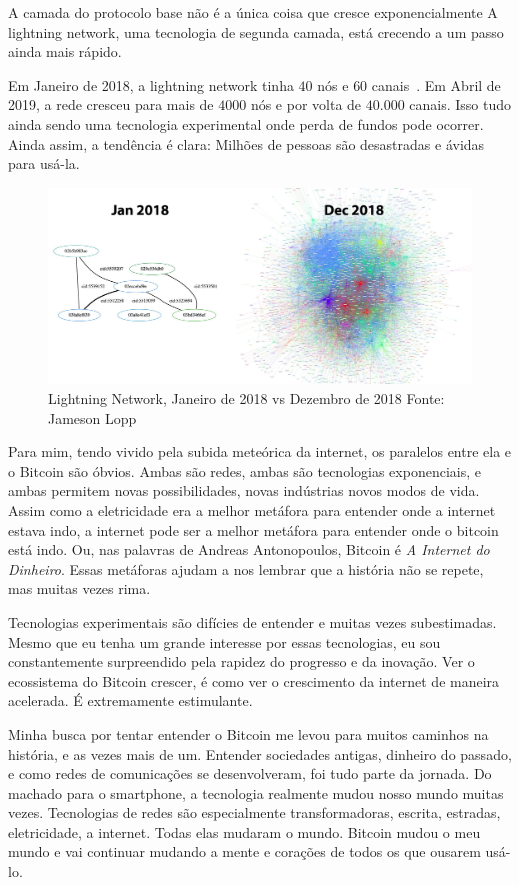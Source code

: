 A camada do protocolo base não é a única coisa que cresce exponencialmente
A lightning network, uma tecnologia de segunda camada, está crecendo a um passo ainda mais rápido.

Em Janeiro de 2018, a lightning network tinha $40$ nós e $60$ canais~\cite{web:lightning-nodes}.
Em Abril de 2019, a rede cresceu para mais de $4000$ nós e por volta de $40.000$ canais.
Isso tudo ainda sendo uma tecnologia experimental onde perda de fundos pode ocorrer. 
Ainda assim, a tendência é clara: Milhões de pessoas são desastradas e ávidas para usá-la.

\begin{figure}
  \includegraphics{assets/images/lnd-growth-lopp-white.png}
  \caption{Lightning Network, Janeiro de 2018 vs Dezembro de 2018 Fonte: Jameson Lopp}
  \label{fig:lnd-growth-lopp-white.png}
\end{figure}

Para mim, tendo vivido pela subida meteórica da internet, os paralelos 
entre ela e o Bitcoin são óbvios. Ambas são redes, ambas são tecnologias 
exponenciais, e ambas permitem novas possibilidades, novas indústrias 
novos modos de vida. Assim como a eletricidade era a melhor metáfora 
para entender onde a internet estava indo, a internet pode ser a melhor 
metáfora para entender onde o bitcoin está indo. Ou, nas palavras de 
Andreas Antonopoulos, Bitcoin é  \textit{A Internet do Dinheiro}.
Essas metáforas ajudam a nos lembrar que a história não se repete, mas muitas vezes rima.

Tecnologias experimentais são difícies de entender e muitas vezes subestimadas.
Mesmo que eu tenha um grande interesse por essas tecnologias, eu sou constantemente 
surpreendido pela rapidez do progresso e da inovação. Ver o ecossistema do Bitcoin crescer, 
é como ver o crescimento da internet de maneira acelerada. É extremamente estimulante.

Minha busca por tentar entender o Bitcoin me levou para muitos caminhos na história, e as vezes mais de um.
Entender sociedades antigas, dinheiro do passado, e como redes de comunicações se desenvolveram, 
foi tudo parte da jornada. Do machado para o smartphone, a tecnologia realmente mudou nosso mundo muitas vezes.
Tecnologias de redes são especialmente transformadoras, escrita, estradas, eletricidade, a internet. 
Todas elas mudaram o mundo. Bitcoin mudou o meu mundo e vai continuar mudando a mente e corações 
de todos os que ousarem usá-lo.

